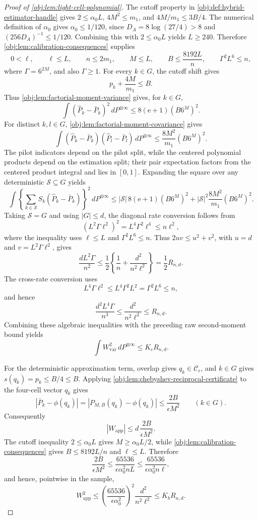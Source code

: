 \begin{proof}[Proof of \cref{obj:lem:light-cell-polynomial}]
The cutoff property in \cref{obj:def:hybrid-estimator-handle} gives \(2\le\alpha_0L\), \(4M^2\le m_1\), and \(4M/m_1\le3B/4\).  The numerical definition of \(\alpha_0\) gives \(\alpha_0\le1/120\), since \(D_A=8\log(27/4)>8\) and \((256D_A)^{-1}\le1/120\).  Combining this with \(2\le\alpha_0L\) yields \(L\ge240\).  Therefore \cref{obj:lem:calibration-consequences} supplies
\[
0<\ell,
\qquad \ell\le L,
\qquad n\le2m_1,
\qquad M\le L,
\qquad B\le\frac{8192L}{n},
\qquad \Gamma^2L^6\le n,
\]
where \(\Gamma=6^{2M}\), and also \(\Gamma\ge1\).  For every \(k\in G\), the cutoff shift gives
\[
p_k+\frac{4M}{m_1}\le B .
\]
Thus \cref{obj:lem:factorial-moment-variance} gives, for \(k\in G\),
\[
\int(\widehat P_k-\bar P_k)^2\,dP^{\otimes\infty}
\le
8(\mathrm e+1)(B6^M)^2.
\]
For distinct \(k,l\in G\), \cref{obj:lem:factorial-moment-covariance} gives
\[
\int(\widehat P_k-\bar P_k)(\widehat P_l-\bar P_l)\,dP^{\otimes\infty}
\le
\frac{8M^2}{m_1}(B6^M)^2 .
\]
The pilot indicators depend on the pilot split, while the centered polynomial products depend on the estimation split; their pair expectation factors from the centered product integral and lies in \([0,1]\).  Expanding the square over any deterministic \(\mathcal S\subseteq G\) yields
\[
\int
\left\{\sum_{k\in \mathcal S}S_k(\widehat P_k-\bar P_k)\right\}^2
\,dP^{\otimes\infty}
\le
|\mathcal S|\,8(\mathrm e+1)(B6^M)^2
+
|\mathcal S|^2\frac{8M^2}{m_1}(B6^M)^2 .
\] %
Taking \(\mathcal S=G\) and using \(|G|\le d\), the diagonal rate conversion follows from
\[
(L^2\Gamma\ell^2)^2=L^4\Gamma^2\ell^4
\le n\ell^2,
\]
where the inequality uses \(\ell\le L\) and \(\Gamma^2L^6\le n\).  Thus \(2uv\le u^2+v^2\), with \(u=d\) and \(v=L^2\Gamma\ell^2\), gives
\[
\frac{dL^2\Gamma}{n^2}
\le
\frac12\left\{\frac1n+\frac{d^2}{n^2\ell^2}\right\}
=
\frac12R_{n,d}.
\]
The cross-rate conversion uses
\[
L^4\Gamma\ell^2\le L^4\Gamma^2L^2=\Gamma^2L^6\le n,
\]
and hence
\[
\frac{d^2L^4\Gamma}{n^3}
\le
\frac{d^2}{n^2\ell^2}
\le R_{n,d}.
\]
Combining these algebraic inequalities with the preceding raw second-moment bound yields
\[
\int W_{\mathrm{var}}^2\,dP^{\otimes\infty}
\le
K_c R_{n,d}.
\] %

For the deterministic approximation term, overlap gives \(q_k\in\mathcal C_\epsilon\), and \(k\in G\) gives \(s(q_k)=p_k\le B/4\le B\).  Applying \cref{obj:lem:chebyshev-reciprocal-certificate} to the four-cell vector \(q_k\) gives
\[
|\bar P_k-\phi(q_k)|
=|P_{M,B}(q_k)-\phi(q_k)|
\le
\frac{2B}{\epsilon M^2}
\qquad (k\in G).
\]
Consequently
\[
|W_{\mathrm{app}}|\le d\,\frac{2B}{\epsilon M^2}.
\]
The cutoff inequality \(2\le\alpha_0L\) gives \(M\ge\alpha_0L/2\), while \cref{obj:lem:calibration-consequences} gives \(B\le8192L/n\) and \(\ell\le L\).  Therefore
\[
\frac{2B}{\epsilon M^2}
\le
\frac{65536}{\epsilon\alpha_0^2 nL}
\le
\frac{65536}{\epsilon\alpha_0^2 n\ell},
\]
and hence, pointwise in the sample,
\[
W_{\mathrm{app}}^2
\le
\left(\frac{65536}{\epsilon\alpha_0^2}\right)^2
\frac{d^2}{n^2\ell^2}
\le K_bR_{n,d}.
\] %


\end{proof}
